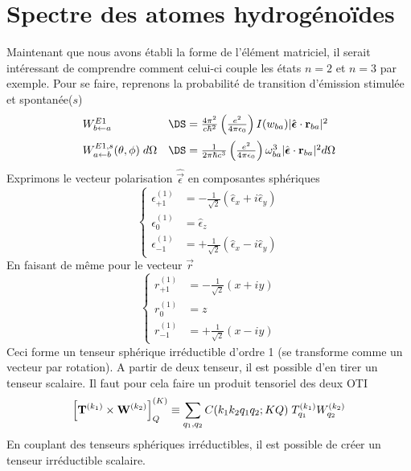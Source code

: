 \section{Spectre des atomes hydrogénoïdes}
Maintenant que nous avons établi la forme de l'élément matriciel, il serait intéressant de comprendre
comment celui-ci couple les états $n=2$ et $n=3$ par exemple. Pour se faire, reprenons la probabilité
de transition d'émission stimulée et spontanée($s$)
\begin{equation}
\begin{array}{ll}
W^{E1}_{b \leftarrow a} &\DS= \frac{4 \pi^2}{c \hbar^2} \left( \frac{e^2}{4 \pi \epsilon_0 } \right)
 I(w_{ba}) \vert  \hat{  \mbox{\boldmath $ \epsilon $}} \cdot 
{\bf  r}_{ba} \vert ^2\vspace{2mm}\\
W_{a \leftarrow b}^{E1,s}(\theta, \phi) \; d \Omega &\DS= 
\frac{1}{2 \pi \hbar c^3} \left( \frac{e^2}{4 \pi \epsilon_0} \right)
  \omega_{b a}^3
\vert  \hat{  \mbox{\boldmath $ \epsilon $}} \cdot 
{\bf  r}_{ba} \vert ^2 d \Omega
\end{array}
\end{equation}
Exprimons le vecteur polarisation $\hat{\vec{\epsilon}}$ en composantes sphériques
\begin{equation}
\left\{
\begin{array}{ll }
\epsilon^{(1)}_{+1}  & = - \frac{1}{\sqrt{2}} 
 \left( \hat{\epsilon}_x + i  \hat{\epsilon}_y \right) \\
\epsilon^{(1)}_{0}  & =  \hat{\epsilon}_z \\
\epsilon^{(1)}_{-1}  & = + \frac{1}{\sqrt{2}}
 \left(  \hat{\epsilon}_x - i  \hat{\epsilon}_y \right)
\end{array} \right.
\end{equation}
En faisant de même pour le vecteur $\vec{r}$
\begin{equation}
\left\{
\begin{array}{ll }
r^{(1)}_{+1}  & = - \frac{1}{\sqrt{2}} \left( x + i y \right) \\
r^{(1)}_{0}  & = z \\
r^{(1)}_{-1}  & = + \frac{1}{\sqrt{2}} \left( x - i y \right)
\end{array} \right.
\end{equation}
Ceci forme un tenseur sphérique irréductible d'ordre 1 (se transforme comme un vecteur par
rotation). A partir de deux tenseur, il est possible d'en tirer un tenseur scalaire. Il faut
pour cela faire un produit tensoriel des deux OTI
\begin{equation}
\left[ {\bf T}^{(k_1)} \times {\bf W}^{(k_2)} \right]^{(K)}_Q \equiv
\sum_{q_1,q_2} C(k_1k_2q_1q_2;KQ) \; T^{(k_1)}_{q_1} W^{(k_2)}_{q_2}
\end{equation}
En couplant des tenseurs sphériques irréductibles, il est possible de créer un tenseur irréductible
scalaire.

